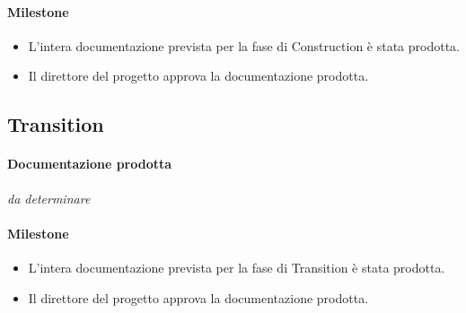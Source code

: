 \paragraph{Milestone}
\begin{itemize}
	\item L'intera documentazione prevista per la fase di Construction \`e stata prodotta.
	\item Il direttore del progetto approva la documentazione prodotta.
\end{itemize}

\subsection{Transition}

\paragraph{Documentazione prodotta}
\emph{da determinare}

\paragraph{Milestone}
\begin{itemize}
	\item L'intera documentazione prevista per la fase di Transition \`e stata prodotta.
	\item Il direttore del progetto approva la documentazione prodotta.
\end{itemize}


